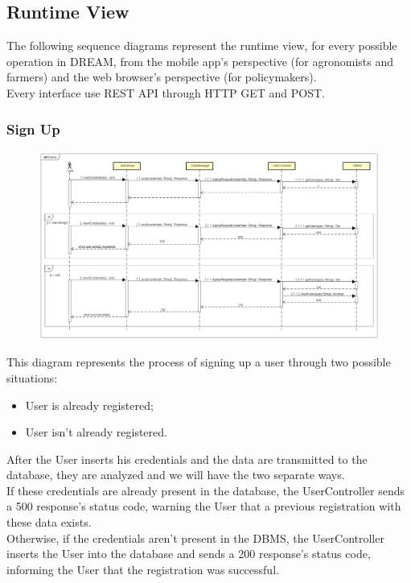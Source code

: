 \newpage

\subsection{Runtime View}
The following sequence diagrams represent the runtime view, for every possible operation in DREAM, 
from the mobile app's perspective (for agronomists and farmers) and the web browser's perspective (for policymakers).\\
Every interface use REST API through HTTP GET and POST.

\subsubsection{Sign Up}

\begin{figure}[H]
    \begin{center}
        \includegraphics[width=\textwidth]{Images/SequenceDiagrams/SignupDD.png}
    \end{center}
\end{figure}

This diagram represents the process of signing up a user through two possible situations: 
\begin{itemize}
    \item User is already registered;
    \item User isn't already registered.
\end{itemize}
After the User inserts his credentials and the data are transmitted to the database, 
they are analyzed and we will have the two separate ways.\\
If these credentials are already present in the database, the UserController 
sends a 500 response's status code, warning the User that a previous registration with these data exists.\\
Otherwise, if the credentials aren't present in the DBMS, the UserController inserts the User 
into the database and sends a 200 response's status code, informing the User that the registration was successful.


